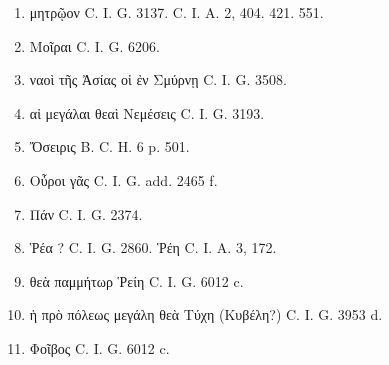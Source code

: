 \documentclass[a4paper, 11pt, oneside, polutonikogreek, german]{article}
\begin{document}
\begin{enumerate}
\item μητρῷον C. I. G. 3137. C. I. A. 2, 404. 421. 551.

\item Μοῖραι C. I. G. 6206.

\item ναοὶ τῆς Ἀσίας οἱ ἐν Σμύρνῃ C. I. G. 3508.

\item αἱ μεγάλαι θεαὶ Νεμέσεις C. I. G. 3193.

\item Ὄσειρις B. C. H. 6 p. 501.

\item Οὖροι γᾶς C. I. G. add. 2465 f.

\item Πάν C. I. G. 2374.

\item Ῥέα ? C. I. G. 2860. Ῥέη C. I. A. 3, 172.

\item θεὰ παμμήτωρ Ῥείη C. I. G. 6012 c.

\item ἡ πρὸ πόλεως μεγάλη θεὰ Τύχη (Κυβέλη?) C. I. G. 3953 d.

\item Φοῖβος C. I. G. 6012 c.
\end{enumerate}
\end{document}

